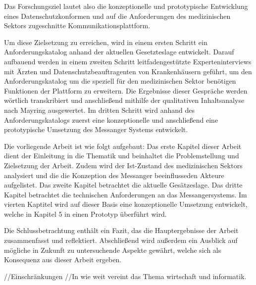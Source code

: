 Das Forschungsziel lautet also die konzeptionelle und prototypische Entwicklung eines Datenschutzkonformen und auf die Anforderungen des medizinischen Sektors zugeschnitte Kommunikationsplattform. 

Um diese Zielsetzung zu erreichen, wird in einem ersten Schritt ein Anforderungskatalog anhand der aktuellen Gesetzteslage entwickelt. Darauf aufbauend werden in einem zweiten Schritt leitfadengestützte Experteninterviews mit Ärzten und Datenschutzbeauftragenten von Krankenhäusern geführt, um den Anforderungskatalog um die speziell für den medizinischen Sektor benötigen Funktionen der Plattform zu erweitern. Die Ergebnisse dieser Gespräche werden wörtlich transkribiert und anschließend mithilfe der qualitativen Inhaltsanalyse nach Mayring ausgewertet. Im dritten Schritt wird anhand des Anforderungskatalogs zuerst eine konzeptionelle und anschließend eine prototypische Umsetzung des Messanger Systems entwickelt. 

Die vorliegende Arbeit ist wie folgt aufgebaut: Das erste Kapitel dieser Arbeit dient der Einleitung in die Thematik und beinhaltet die Problemstellung und Zielsetzung der Arbeit. Zudem wird der Ist-Zustand des medizinischen Sektors analysiert und die die Konzeption des Messanger beeinflusseden Akteure aufgelistet. Das zweite Kapitel betrachtet die aktuelle Gesätzeslage. Das dritte Kapitel betrachtet die technischen Anforderungen an das Messangersystems. Im vierten Kaptitel wird auf dieser Basis eine konzeptionelle Umsetzung entwickelt, welche in Kapitel 5 in einen Prototyp überführt wird.

Die Schlussbetrachtung enthält ein Fazit, das die Hauptergebnisse der Arbeit zusammenfasst und reflektiert. Abschließend wird außerdem ein Ausblick auf mögliche in Zukunft zu untersuchende Aspekte gewährt, welche sich als Konsequenz aus dieser Arbeit ergeben.

//Einschränkungen
//In wie weit vereint das Thema wirtschaft und informatik. 